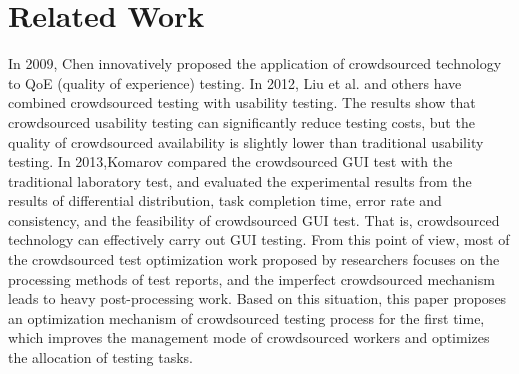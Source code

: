 \section{Related Work}

In 2009, Chen\cite{b6} innovatively proposed the application of crowdsourced technology to QoE (quality of experience) testing. In 2012, Liu et al.\cite{b7} and others have combined crowdsourced testing with usability testing. The results show that crowdsourced usability testing can significantly reduce testing costs, but the quality of crowdsourced availability is slightly lower than traditional usability testing. In 2013,Komarov\cite{b8} compared the crowdsourced GUI test with the traditional laboratory test, and evaluated the experimental results from the results of differential distribution, task completion time, error rate and consistency, and the feasibility of crowdsourced GUI test. That is, crowdsourced technology can effectively carry out GUI testing. From this point of view, most of the crowdsourced test optimization work proposed by researchers focuses on the processing methods of test reports, and the imperfect crowdsourced mechanism leads to heavy post-processing work. Based on this situation, this paper proposes an optimization mechanism of crowdsourced testing process for the first time, which improves the management mode of crowdsourced workers and optimizes the allocation of testing tasks.

